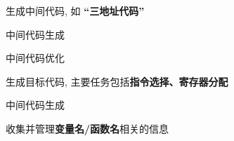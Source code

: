 \begin{frame}{}
  \begin{center}
     生成中间代码, 如 {\bf ``三地址代码''}
  \end{center}

  \begin{exampleblock}{中间代码生成}
    \begin{center}
    \end{center}
  \end{exampleblock}
\end{frame}

\begin{frame}{}
  \begin{exampleblock}{中间代码优化}
    \begin{center}
    \end{center}
  \end{exampleblock}
\end{frame}

\begin{frame}{}
  \begin{center}
     生成目标代码, 主要任务包括{\bf 指令选择、寄存器分配}
  \end{center}

  \begin{exampleblock}{中间代码生成}
    \begin{center}
    \end{center}
  \end{exampleblock}
\end{frame}

\begin{frame}{}
  \begin{center}
     收集并管理{\bf 变量名/函数名}相关的信息
  \end{center}

\end{frame}

